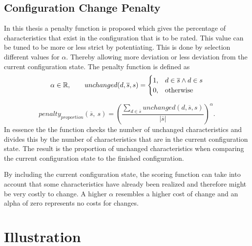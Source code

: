 \subsection{Configuration Change Penalty}
\label{subsec:Concept:ReccomendationGeneration:Penalty}

In this thesis a penalty function is proposed which gives the percentage of characteristics that exist in the configuration that is to be rated. This value can be tuned to be more or less strict by potentiating. This is done by selection different values for $\alpha$. Thereby allowing more deviation or less deviation from the current configuration state. The penalty function is defined as
\begin{equation}
    \notag \alpha \in \mathbb{R}, \qquad     unchanged(d,\overline{s}, s) = 
    \begin{cases}
      1, & d \in \overline{s} \land d \in s \\
      0, & \text{otherwise}
    \end{cases}
\end{equation}

\begin{equation}
    penalty_{proportion}(\overline{s},\ s) =  \left(\frac{\sum_{d \in \overline{s}} unchanged(d,\overline{s}, s)}{|\overline{s}|}\right)^\alpha.
\end{equation}
In essence the the function checks the number of unchanged characteristics and divides this by the number of characteristics that are in the current configuration state. The result is the proportion of unchanged characteristics when comparing the current configuration state to the finished configuration.

By including the current configuration state, the scoring function can take into account that some characteristics have already been realized and therefore might be very costly to change. A higher $\alpha$ resembles a higher cost of change and an alpha of zero represents no costs for changes.

\section{Illustration}
\label{sec:Concept:Illustration}

